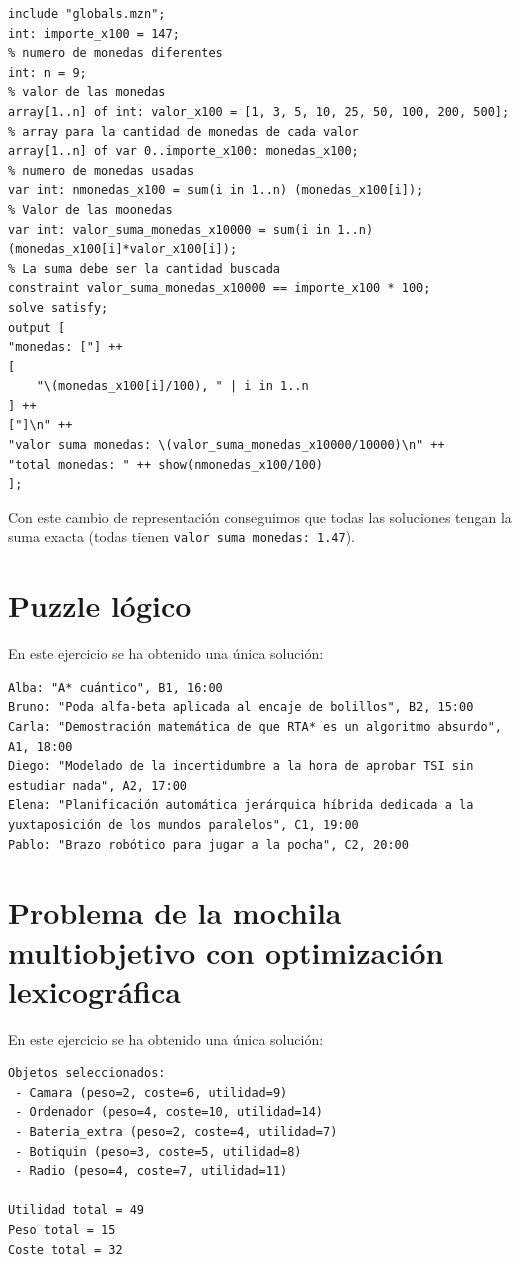 \documentclass[11pt]{article}
\begin{document}
\begin{enumerate}[label=\alph*)]
\begin{enumerate}
\begin{lstlisting}[language=MiniZinc]
include "globals.mzn";
int: importe_x100 = 147;
% numero de monedas diferentes
int: n = 9;
% valor de las monedas
array[1..n] of int: valor_x100 = [1, 3, 5, 10, 25, 50, 100, 200, 500];
% array para la cantidad de monedas de cada valor
array[1..n] of var 0..importe_x100: monedas_x100;
% numero de monedas usadas
var int: nmonedas_x100 = sum(i in 1..n) (monedas_x100[i]);
% Valor de las moonedas
var int: valor_suma_monedas_x10000 = sum(i in 1..n)(monedas_x100[i]*valor_x100[i]);
% La suma debe ser la cantidad buscada
constraint valor_suma_monedas_x10000 == importe_x100 * 100;
solve satisfy;
output [
"monedas: ["] ++
[
    "\(monedas_x100[i]/100), " | i in 1..n
] ++
["]\n" ++
"valor suma monedas: \(valor_suma_monedas_x10000/10000)\n" ++ 
"total monedas: " ++ show(nmonedas_x100/100)
];
\end{lstlisting}
    \end{enumerate}
    Con este cambio de representación conseguimos que todas las soluciones tengan la suma exacta (todas tienen \verb|valor suma monedas: 1.47|).

\end{enumerate}

\section{Puzzle lógico}
En este ejercicio se ha obtenido una única solución:
\begin{lstlisting}[language=MiniZinc]
Alba: "A* cuántico", B1, 16:00
Bruno: "Poda alfa-beta aplicada al encaje de bolillos", B2, 15:00
Carla: "Demostración matemática de que RTA* es un algoritmo absurdo", A1, 18:00
Diego: "Modelado de la incertidumbre a la hora de aprobar TSI sin estudiar nada", A2, 17:00
Elena: "Planificación automática jerárquica híbrida dedicada a la yuxtaposición de los mundos paralelos", C1, 19:00
Pablo: "Brazo robótico para jugar a la pocha", C2, 20:00
\end{lstlisting}

\section{Problema de la mochila multiobjetivo con optimización lexicográfica}
En este ejercicio se ha obtenido una única solución:
\begin{lstlisting}[language=MiniZinc]
Objetos seleccionados:
 - Camara (peso=2, coste=6, utilidad=9)
 - Ordenador (peso=4, coste=10, utilidad=14)
 - Bateria_extra (peso=2, coste=4, utilidad=7)
 - Botiquin (peso=3, coste=5, utilidad=8)
 - Radio (peso=4, coste=7, utilidad=11)

Utilidad total = 49
Peso total = 15
Coste total = 32
\end{lstlisting}
\end{document}
